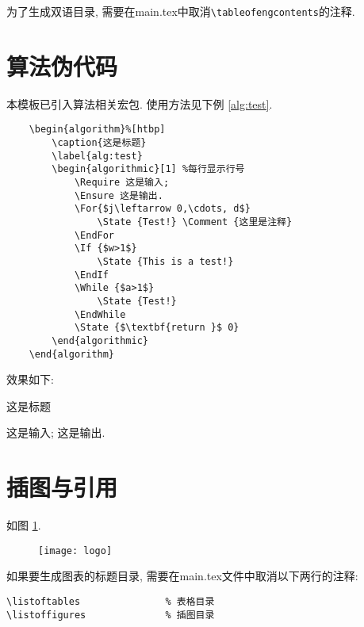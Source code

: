 为了生成双语目录, 需要在main.tex中取消\verb|\tableofengcontents|的注释.

\section{算法伪代码}
本模板已引入算法相关宏包. 使用方法见下例 \ref{alg:test}.
\begin{verbatim}
    \begin{algorithm}%[htbp]
        \caption{这是标题}
        \label{alg:test}
        \begin{algorithmic}[1] %每行显示行号
            \Require 这是输入;
            \Ensure 这是输出.
            \For{$j\leftarrow 0,\cdots, d$}
                \State {Test!} \Comment {这里是注释}
            \EndFor
            \If {$w>1$}
                \State {This is a test!}
            \EndIf
            \While {$a>1$}
                \State {Test!}
            \EndWhile
            \State {$\textbf{return }$ 0}
        \end{algorithmic}
    \end{algorithm}
\end{verbatim}

效果如下:
\begin{algorithm}%
    \caption{这是标题}
    \label{alg:test}
    \begin{algorithmic}[1] %
        \Require 这是输入;
        \Ensure 这是输出.
             
        \EndFor
        \EndIf
        \EndWhile
    \end{algorithmic}
\end{algorithm}


\section{插图与引用}
如图 \ref{fig:logo}.
\begin{figure}[h]
	\centering
	\texttt{[image: logo]}
	\label{fig:logo}
\end{figure}

如果要生成图表的标题目录, 需要在main.tex文件中取消以下两行的注释:
\begin{verbatim}
\listoftables               % 表格目录
\listoffigures              % 插图目录
\end{verbatim}

